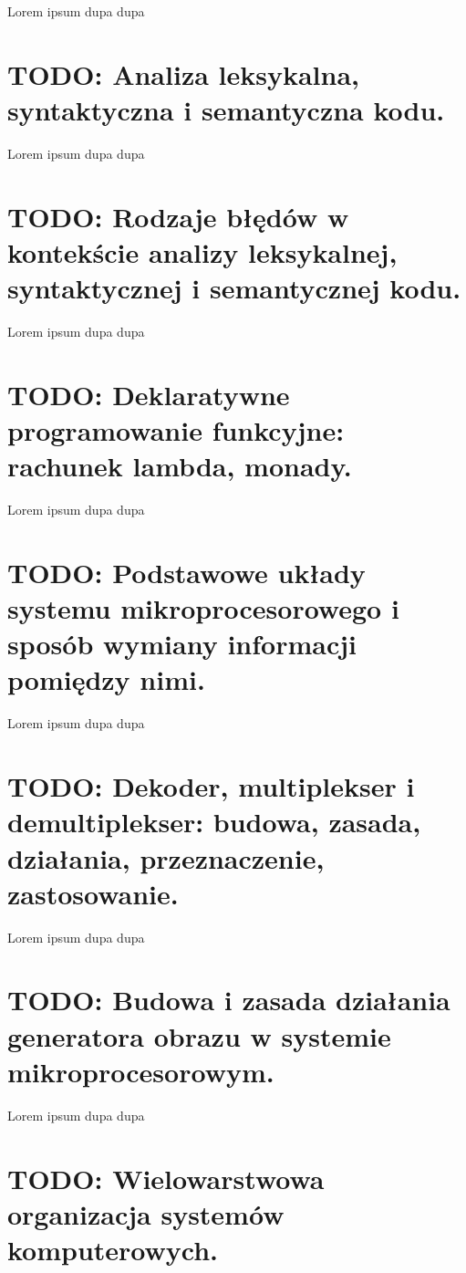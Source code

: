 \documentclass[a4paper,12pt,oneside]{book}
\begin{document}
					Lorem ipsum dupa dupa
	
	\setcounter{section}{49}
	\section{\color{red} TODO: Analiza leksykalna, syntaktyczna i semantyczna kodu. }
					
					Lorem ipsum dupa dupa
	
	\setcounter{section}{50}
	\section{\color{red} TODO: Rodzaje błędów w kontekście analizy leksykalnej, syntaktycznej i semantycznej kodu.}
					
					Lorem ipsum dupa dupa
					
	\setcounter{section}{51}
	\section{\color{red} TODO: Deklaratywne programowanie funkcyjne: rachunek lambda, monady. }
					
					Lorem ipsum dupa dupa
	
	\setcounter{section}{53}
	\section{\color{red} TODO: Podstawowe układy systemu mikroprocesorowego i sposób wymiany informacji pomiędzy nimi. }
					
					Lorem ipsum dupa dupa
	
	\setcounter{section}{54}
	\section{\color{red} TODO: Dekoder, multiplekser i demultiplekser: budowa, zasada, działania, przeznaczenie, zastosowanie. }
					
					Lorem ipsum dupa dupa
	
	\setcounter{section}{56}
	\section{\color{red} TODO: Budowa i zasada działania generatora obrazu w systemie mikroprocesorowym. }
					
					Lorem ipsum dupa dupa
	
	\setcounter{section}{22}
	\section{\color{red} TODO: Wielowarstwowa organizacja systemów komputerowych. }
						
\end{document}
